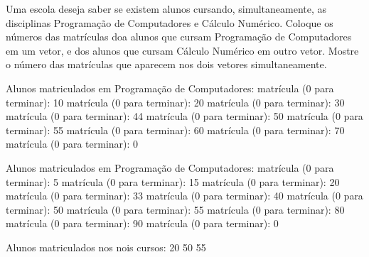 \documentclass[11pt]{practice}
\begin{document}
\begin{task}[breakable]{}{}
  Uma escola deseja saber se existem alunos cursando, simultaneamente,
  as disciplinas Programação de Computadores e Cálculo Numérico. Coloque
  os números das matrículas doa alunos que cursam Programação de
  Computadores em um vetor, e dos alunos que cursam Cálculo Numérico em
  outro vetor. Mostre o número das matrículas que aparecem nos dois
  vetores simultaneamente.

  \begin{runexample}
Alunos matriculados em Programação de Computadores:
matrícula (0 para terminar): 10
matrícula (0 para terminar): 20
matrícula (0 para terminar): 30
matrícula (0 para terminar): 44
matrícula (0 para terminar): 50
matrícula (0 para terminar): 55
matrícula (0 para terminar): 60
matrícula (0 para terminar): 70
matrícula (0 para terminar): 0

Alunos matriculados em Programação de Computadores:
matrícula (0 para terminar): 5
matrícula (0 para terminar): 15
matrícula (0 para terminar): 20
matrícula (0 para terminar): 33
matrícula (0 para terminar): 40
matrícula (0 para terminar): 50
matrícula (0 para terminar): 55
matrícula (0 para terminar): 80
matrícula (0 para terminar): 90
matrícula (0 para terminar): 0

Alunos matriculados nos nois cursos:
20 50 55
  \end{runexample}

  \tcblower
  \solution
\end{task}
\end{document}
